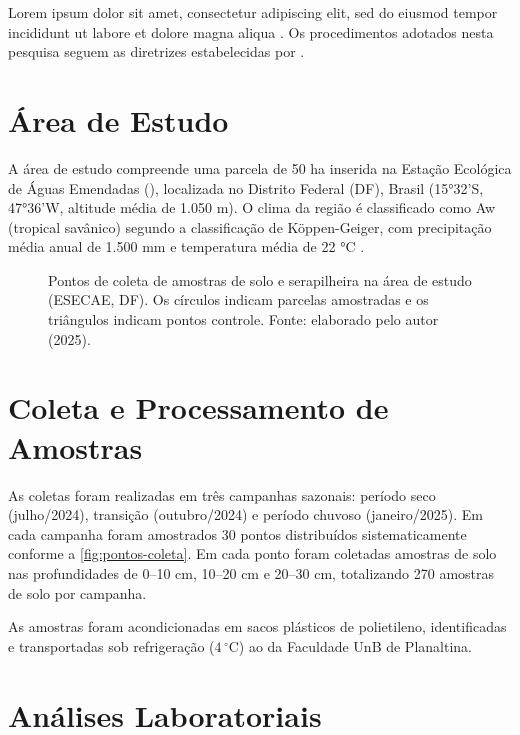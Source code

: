 
Lorem ipsum dolor sit amet, consectetur adipiscing elit, sed do eiusmod
tempor incididunt ut labore et dolore magna aliqua \cite{exemplo:artigo:2024}.
Os procedimentos adotados nesta pesquisa seguem as diretrizes estabelecidas
por .

\section{Área de Estudo}

A área de estudo compreende uma parcela de 50 ha inserida na Estação
Ecológica de Águas Emendadas (), localizada no Distrito Federal (DF), Brasil
(15°32'S, 47°36'W, altitude média de 1.050 m). O clima da região é
classificado como Aw (tropical savânico) segundo a classificação de
Köppen-Geiger, com precipitação média anual de 1.500 mm e temperatura
média de 22 °C \cite{exemplo:web:2024}.

\begin{figure}[H]
  \centering
  \fbox{\rule{0pt}{6cm}\rule{12cm}{0pt}}
  \caption{Pontos de coleta de amostras de solo e serapilheira na
           área de estudo (ESECAE, DF). Os círculos indicam parcelas
           amostradas e os triângulos indicam pontos controle.
           Fonte: elaborado pelo autor (2025).}
  \label{fig:pontos-coleta}
\end{figure}

\section{Coleta e Processamento de Amostras}

As coletas foram realizadas em três campanhas sazonais: período seco
(julho/2024), transição (outubro/2024) e período chuvoso (janeiro/2025).
Em cada campanha foram amostrados 30 pontos distribuídos sistematicamente
conforme a \autoref{fig:pontos-coleta}. Em cada ponto foram coletadas
amostras de solo nas profundidades de 0--10 cm, 10--20 cm e 20--30 cm,
totalizando 270 amostras de solo por campanha.

As amostras foram acondicionadas em sacos plásticos de polietileno,
identificadas e transportadas sob refrigeração ($4\,^\circ\text{C}$) ao
da Faculdade UnB de Planaltina.

\section{Análises Laboratoriais}

